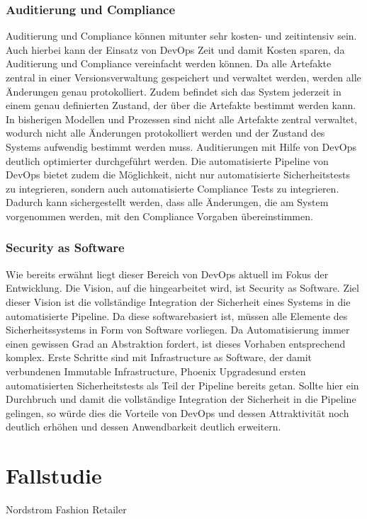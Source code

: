 \subsubsection{Auditierung und Compliance}
Auditierung und Compliance können mitunter sehr kosten- und zeitintensiv sein. Auch hierbei kann der Einsatz von DevOps Zeit und damit Kosten sparen, da Auditierung und Compliance vereinfacht werden können. Da alle Artefakte zentral in einer Versionsverwaltung gespeichert und verwaltet werden, werden alle Änderungen genau protokolliert. Zudem befindet sich das System jederzeit in einem genau definierten Zustand, der über die Artefakte bestimmt werden kann. In bisherigen Modellen und Prozessen sind nicht alle Artefakte zentral verwaltet, wodurch nicht alle Änderungen protokolliert werden und der Zustand des Systems aufwendig bestimmt werden muss. Auditierungen mit Hilfe von DevOps deutlich optimierter durchgeführt werden. Die automatisierte Pipeline von DevOps bietet zudem die Möglichkeit, nicht nur automatisierte Sicherheitstests zu integrieren, sondern auch automatisierte Compliance Tests zu integrieren. Dadurch kann sichergestellt werden, dass alle Änderungen, die am System vorgenommen werden, mit den Compliance Vorgaben übereinstimmen.\\

\subsubsection{Security as Software}
Wie bereits erwähnt liegt dieser Bereich von DevOps aktuell im Fokus der Entwicklung. Die Vision, auf die hingearbeitet wird, ist \glqq Security as Software\grqq. Ziel dieser Vision ist die vollständige Integration der Sicherheit eines Systems in die automatisierte Pipeline. Da diese softwarebasiert ist, müssen alle Elemente des Sicherheitssystems in Form von Software vorliegen. Da Automatisierung immer einen gewissen Grad an Abstraktion fordert, ist dieses Vorhaben entsprechend komplex. Erste Schritte sind mit \glqq Infrastructure as Software\grqq, der damit verbundenen \glqq Immutable Infrastructure\grqq, \glqq Phoenix Upgrades\grqq und ersten automatisierten Sicherheitstests als Teil der Pipeline bereits getan. Sollte hier ein Durchbruch und damit die vollständige Integration der Sicherheit in die Pipeline gelingen, so würde dies die Vorteile von DevOps und dessen Attraktivität noch deutlich erhöhen und dessen Anwendbarkeit deutlich erweitern.


\section{Fallstudie} %
Nordstrom Fashion Retailer

